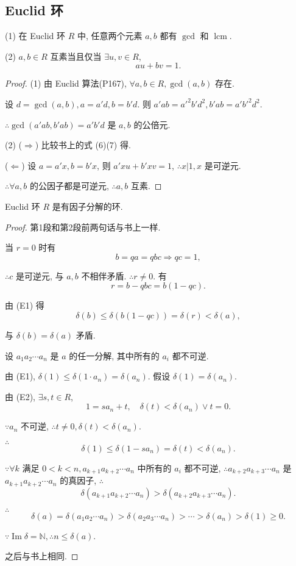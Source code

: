 \documentclass[UTF8]{ctexart}
\begin{document}
\subsection{Euclid 环}
\begin{theorem}[书上的定理3]
    (1) 在 Euclid 环 $R$ 中, 任意两个元素 $a,b$ 都有 $\gcd$ 和 $\operatorname{lcm}$.

    (2) $a,b\in R$ 互素当且仅当 $\exists u,v\in R$,
    \[au+bv=1.\]
\end{theorem}
\begin{proof}
    (1) 由 Euclid 算法(P167), $\forall a,b\in R,\gcd(a,b)$ 存在.

    设 $d=\gcd(a,b),a=a'd,b=b'd$. 则 $a'ab=a'^2b'd^2,b'ab=a'b'^2d^2$.

    $\therefore\gcd(a'ab,b'ab)=a'b'd$ 是 $a,b$ 的公倍元.

    (2) ($\Rightarrow$) 比较书上的式 (6)(7) 得.

    ($\Leftarrow$) 设 $a=a'x,b=b'x$, 则 $a'xu+b'xv=1$, $\therefore x|1,x$ 是可逆元.

    $\therefore\forall a,b$ 的公因子都是可逆元, $\therefore a,b$ 互素.
\end{proof}
\begin{theorem}[书上的引理]\label{t3.2}
    Euclid 环 $R$ 是有因子分解的环.
\end{theorem}
\begin{proof}
    第1段和第2段前两句话与书上一样.

    当 $r=0$ 时有
    \[b=qa=qbc\Rightarrow qc=1,\]

    $\therefore c$ 是可逆元, 与 $a,b$ 不相伴矛盾. $\therefore r\neq0$. 有
    \[r=b-qbc=b(1-qc).\]

    由 (E1) 得
    \[\delta(b)\leq\delta(b(1-qc))=\delta(r)<\delta(a),\]
    
    与 $\delta(b)=\delta(a)$ 矛盾.

    设 $a_1a_2\cdots a_n$ 是 $a$ 的任一分解, 其中所有的 $a_i$ 都不可逆.

    由 (E1), $\delta(1)\leq\delta(1\cdot a_n)=\delta(a_n)$. 假设 $\delta(1)=\delta(a_n)$.

    由 (E2), $\exists s,t\in R$,
    \[1=sa_n+t,\quad\delta(t)<\delta(a_n)\vee t=0.\]

    $\because a_n$ 不可逆, $\therefore t\neq0,\delta(t)<\delta(a_n)$.

    $\therefore$
    \[\delta(1)\leq\delta(1-sa_n)=\delta(t)<\delta(a_n).\]

    $\because\forall k$ 满足 $0<k<n,a_{k+1}a_{k+2}\cdots a_n$ 中所有的 $a_i$ 都不可逆, $\therefore a_{k+2}a_{k+3}\cdots a_n$ 是 $a_{k+1}a_{k+2}\cdots a_n$ 的真因子, $\therefore$
    \[\delta(a_{k+1}a_{k+2}\cdots a_n)>\delta(a_{k+2}a_{k+3}\cdots a_n).\]

    $\therefore$
    \[\delta(a)=\delta(a_1a_2\cdots a_n)>\delta(a_2a_3\cdots a_n)>\cdots>\delta(a_n)>\delta(1)\geq0.\]

    $\because\operatorname{Im}\delta=\mathbb{N},\therefore n\leq\delta(a)$.

    之后与书上相同.
\end{proof}
\end{document}
